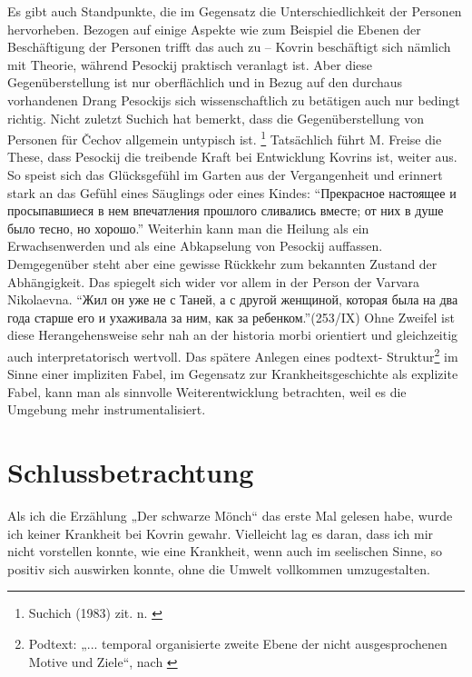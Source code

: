 \documentclass[12pt,headsepline,a4paper]{scrartcl}
\newcommand\textcyr[1]{{\fontencoding{OT2}\fontfamily{wncyr}\selectfont ``#1''}}
\begin{document}
Es gibt auch Standpunkte, die im Gegensatz die Unterschiedlichkeit der 
Personen hervorheben.\autocite{winner}
Bezogen auf einige Aspekte wie zum Beispiel die Ebenen der Beschäftigung der Personen trifft das
auch zu -- Kovrin beschäftigt sich nämlich mit Theorie, während Pesockij praktisch veranlagt ist.
Aber diese Gegenüberstellung ist nur oberflächlich und in Bezug auf den durchaus vorhandenen
Drang Pesockijs sich wissenschaftlich zu betätigen auch nur bedingt richtig. Nicht zuletzt Suchich
hat bemerkt, dass die Gegenüberstellung von Personen für Čechov allgemein untypisch ist.
\footnote{Suchich (1983) zit. n. \autocite{freise91}} 
Tatsächlich führt M. Freise die These, dass Pesockij die treibende Kraft bei Entwicklung Kovrins
ist, weiter aus. So speist sich das Glücksgefühl im Garten aus der Vergangenheit und erinnert stark
an das Gefühl eines Säuglings oder eines Kindes: \textcyr{Прекрасное настоящее и просыпавшиеся в
нем впечатления прошлого сливались вместе; от них в душе было тесно, но хорошо.}
Weiterhin kann man die Heilung als ein Erwachsenwerden und als eine Abkapselung von Pesockij
auffassen. Demgegenüber steht aber eine gewisse Rückkehr zum bekannten Zustand der
Abhängigkeit. Das spiegelt sich wider vor allem in der Person der Varvara Nikolaevna. \textcyr{Жил он
уже не с Таней, а с другой женщиной, которая была на два года старше его и ухаживала за
ним, как за ребенком.}(253/IX) Ohne Zweifel ist diese Herangehensweise sehr nah an der historia
morbi orientiert und gleichzeitig auch interpretatorisch wertvoll. Das spätere Anlegen eines podtext-
Struktur\footnote{
Podtext: „... temporal organisierte zweite Ebene der nicht ausgesprochenen Motive und Ziele“, nach \autocite{freise97}
} im Sinne einer impliziten Fabel, im Gegensatz zur Krankheitsgeschichte als explizite
Fabel, kann man als sinnvolle Weiterentwicklung betrachten, weil es die Umgebung mehr
instrumentalisiert.

\section*{Schlussbetrachtung}
Als ich die Erzählung „Der schwarze Mönch“ das erste Mal gelesen habe, wurde ich keiner
Krankheit bei Kovrin gewahr. Vielleicht lag es daran, dass ich mir nicht vorstellen konnte, wie eine
Krankheit, wenn auch im seelischen Sinne, so positiv sich auswirken konnte, ohne die Umwelt
vollkommen umzugestalten.
\end{document}
